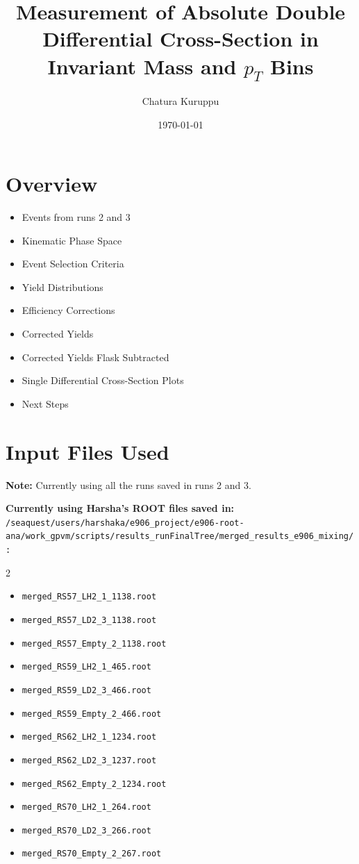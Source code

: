 \documentclass[12pt]{article}
\title{Measurement of Absolute Double Differential Cross-Section in Invariant Mass and $p_T$ Bins}
\author{Chatura Kuruppu}
\date{\today}
\begin{document}
\maketitle

\section{Overview}

\begin{itemize}
    \setlength{\itemsep}{0.5em}
    \item Events from runs 2 and 3
    \item Kinematic Phase Space
    \item Event Selection Criteria
    \item Yield Distributions
    \item Efficiency Corrections
    \item Corrected Yields
    \item Corrected Yields Flask Subtracted
    \item Single Differential Cross-Section Plots
    \item Next Steps
\end{itemize}


\section{Input Files Used}

\textbf{Note:} Currently using all the runs saved in runs 2 and 3.

\vspace{0.2cm}
\tiny
\textbf{Currently using Harsha's ROOT files saved in:} \\
\texttt{/seaquest/users/harshaka/e906\_project/e906-root-ana/work\_gpvm/scripts/results\_runFinalTree/merged\_results\_e906\_mixing/:}
\begin{multicols}{2}
\begin{itemize}
    \item \texttt{merged\_RS57\_LH2\_1\_1138.root}
    \item \texttt{merged\_RS57\_LD2\_3\_1138.root}
    \item \texttt{merged\_RS57\_Empty\_2\_1138.root}
    \item \texttt{merged\_RS59\_LH2\_1\_465.root}
    \item \texttt{merged\_RS59\_LD2\_3\_466.root}
    \item \texttt{merged\_RS59\_Empty\_2\_466.root}
    \item \texttt{merged\_RS62\_LH2\_1\_1234.root}
    \item \texttt{merged\_RS62\_LD2\_3\_1237.root}
    \item \texttt{merged\_RS62\_Empty\_2\_1234.root}
    \item \texttt{merged\_RS70\_LH2\_1\_264.root}
    \item \texttt{merged\_RS70\_LD2\_3\_266.root}
    \item \texttt{merged\_RS70\_Empty\_2\_267.root}
\end{itemize}
\end{multicols}
\end{document}
